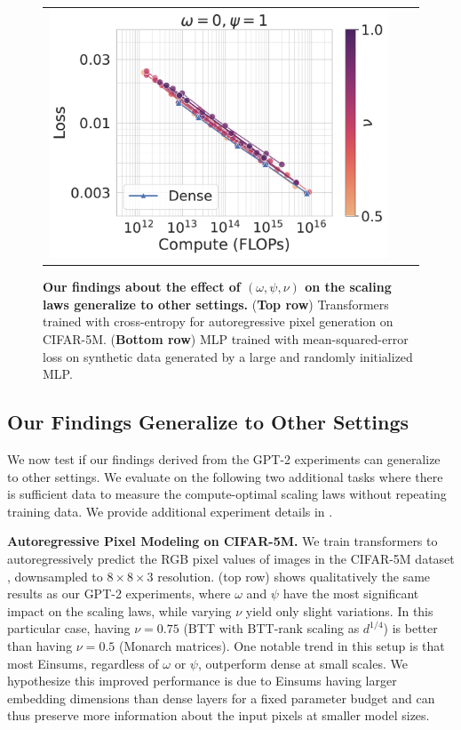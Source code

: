 \documentclass{article}
\begin{document}
\begin{figure}[!t]
\begin{tabular}{ccc}
    \hspace{-5mm}
    \includegraphics[height=0.28\linewidth, trim=3.5cm 0cm 0cm 0cm, clip]{figs/rebuttal/mlp/nu.pdf}
    \end{tabular}
   \caption{\textbf{Our findings about the effect of $(\omega, \psi, \nu)$ on the scaling laws generalize to other settings.}
   (\textbf{Top row}) Transformers trained with cross-entropy for autoregressive pixel generation on CIFAR-5M. (\textbf{Bottom row}) MLP trained with mean-squared-error loss on synthetic data generated by a large and randomly initialized MLP.
   }
    \label{fig:more_scaling_laws_analysis}
    \vspace{-2mm}
\end{figure}

\subsection{Our Findings Generalize to Other Settings}
We now test if our findings derived from the GPT-2 experiments can generalize to other settings. We evaluate on the following two additional tasks where there is sufficient data to measure the compute-optimal scaling laws without repeating training data. We provide additional experiment details in .

\noindent \textbf{Autoregressive Pixel Modeling on CIFAR-5M.} \quad We train transformers to autoregressively predict the RGB pixel values of images in the CIFAR-5M dataset \citep{nakkiran2020deep}, downsampled to $8\times8\times3$ resolution.  (top row) shows qualitatively the same results as our GPT-2 experiments, where $\omega$ and $\psi$ have the most significant impact on the scaling laws, while varying $\nu$ yield only slight variations. In this particular case, having $\nu = 0.75$ (BTT with BTT-rank scaling as $d^{1/4}$) is better than having $\nu=0.5$ (Monarch matrices). One notable trend in this setup is that most Einsums, regardless of $\omega$ or $\psi$, outperform dense at small scales. We hypothesize this improved performance is due to Einsums having larger embedding dimensions than dense layers for a fixed parameter budget and can thus preserve more information about the input pixels at smaller model sizes.
\end{document}
